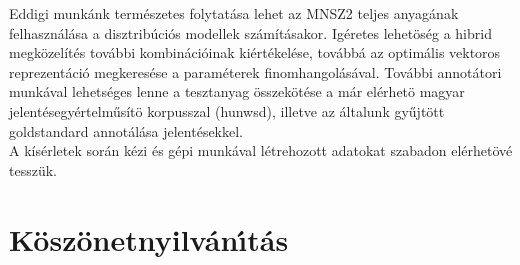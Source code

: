 \documentclass{llncs}
\begin{document}
Eddigi munk\'{a}nk term\'{e}szetes folytat\'{a}sa lehet az MNSZ2 teljes anyag\'{a}nak felhaszn\'{a}l\'{a}sa a disztrib\'{u}ci\'{o}s modellek sz\'{a}m\'{i}t\'{a}sakor. Ig\'{e}retes lehet\"{o}s\'{e}g a hibrid megk\"{o}zel\'{i}t\'{e}s tov\'{a}bbi kombin\'{a}ci\'{o}inak ki\'{e}rt\'{e}kel\'{e}se, tov\'{a}bb\'{a} az optim\'{a}lis vektoros reprezent\'{a}ci\'{o} megkeres\'{e}se a param\'{e}terek finomhangol\'{a}s\'{a}val. Tov\'{a}bbi annot\'{a}tori munk\'{a}val lehets\'{e}ges lenne a tesztanyag \"{o}sszek\"{o}t\'{e}se a m\'{a}r el\'{e}rhet\"{o} magyar jelent\'{e}segy\'{e}rtelm\H{u}s\'{i}t\"{o} korpusszal (hunwsd), illetve az \'{a}ltalunk gy\H{u}jt\"{o}tt goldstandard annot\'{a}l\'{a}sa jelent\'{e}sekkel.\\

A k\'{i}s\'{e}rletek sor\'{a}n k\'{e}zi \'{e}s g\'{e}pi munk\'{a}val l\'{e}trehozott adatokat szabadon el\'{e}rhet\"{o}v\'{e} tessz\"{u}k.
 

\section{K\"osz\"onetnyilv\'an\'\i t\'as}
\end{document}
